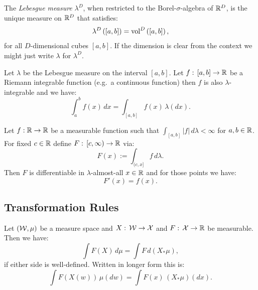 \begin{Thm}
 The \emph{Lebesgue measure} $\lambda^D$, when restricted to the Borel-$\sigma$-algebra of $\mathbb{R}^D$,
  is the unique measure on $\mathbb{R}^D$ that satisfies:
    \[ \lambda^D\left ( [a,b] \right ) = \mathrm{vol}^D\left ( [a,b] \right ),     \]
    for all $D$-dimensional cubes $[a,b]$.
    If the dimension is clear from the context we might just write $\lambda$ for $\lambda^D$.
\end{Thm}

\begin{Thm} Let $\lambda$ be the Lebesgue measure on the interval $[a,b]$.  Let $f:\, [a,b] \to \mathbb{R}$ be a Riemann integrable function (e.g.\ a continuous function) then $f$ is also $\lambda$-integrable and we have:
    \[ \int_a^b f(x)\,dx = \int_{[a,b]}  f(x)\, \lambda(dx). \]
\end{Thm}

\begin{Thm}
    Let $f: \mathbb{R} \to \mathbb{R}$ be a measurable function such that $\int_{[a,b]}  |f| \,d\lambda < \infty$ for $a,b \in \mathbb{R}$. %
            For fixed $c \in \mathbb{R}$ define $F:\, [c,\infty) \to \mathbb{R}$ via:
            \[ F(x) := \int_{(c,x]} f\,d\lambda.  \]
            Then $F$ is differentiable in  $\lambda$-almost-all $x \in \mathbb{R}$ and for those points we have:
            \[ F'(x) = f(x).\]
\end{Thm}

\subsection{Transformation Rules}


\begin{Thm}
    Let $(\mathcal{W},\mu)$ be a measure space and $X :\,\mathcal{W} \to \mathcal{X}$ and $F:\, \mathcal{X} \to \mathbb{R}$ be measurable.
    Then we have:
    \[ \int F(X)\,d\mu = \int F\, d(X_*\mu),  \]
    if either side is well-defined.
    Written in longer form this is:
    \[ \int F(X(w))\,\mu(dw) = \int F(x)\, (X_*\mu)(dx).  \]
\end{Thm}



